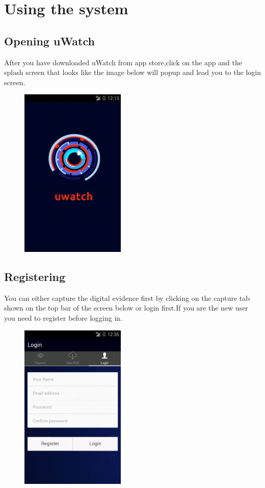 \documentclass[a4paper,12pt]{article}
\begin{document}
\section{Using the system}
\subsection{Opening uWatch}
After you have downloaded uWatch from app store,click on the app and the splash screen that looks like the image below will popup and lead you to the login screen.
\begin{figure}[H]
\begin{center}
\includegraphics[width=50mm,scale=0.5]{images/screenshots/splashscreen.png}
\end{center}
\end{figure}
\subsection{Registering}
You can either capture the digital evidence first by clicking on the capture tab shown on the top bar of the screen below or login first.If you are the new user you need to register before logging in.
\begin{figure}[H]
\begin{center}
\includegraphics[width=50mm,scale=0.5]{images/screenshots/register.png}
\end{center}
\end{figure}
\end{document}
